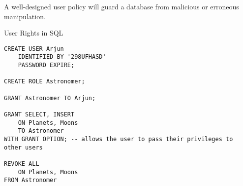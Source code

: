 A well-designed user policy will guard a database from malicious or erroneous manipulation.

\begin{listing}[H]
	\caption{User Rights in SQL}
	\label{lis:users}
	\begin{verbatim}
CREATE USER Arjun
	IDENTIFIED BY '298UFHASD'
	PASSWORD EXPIRE;

CREATE ROLE Astronomer;

GRANT Astronomer TO Arjun;

GRANT SELECT, INSERT
	ON Planets, Moons
	TO Astronomer
WITH GRANT OPTION; -- allows the user to pass their privileges to other users

REVOKE ALL
	ON Planets, Moons
FROM Astronomer
	\end{verbatim}
\end{listing}




